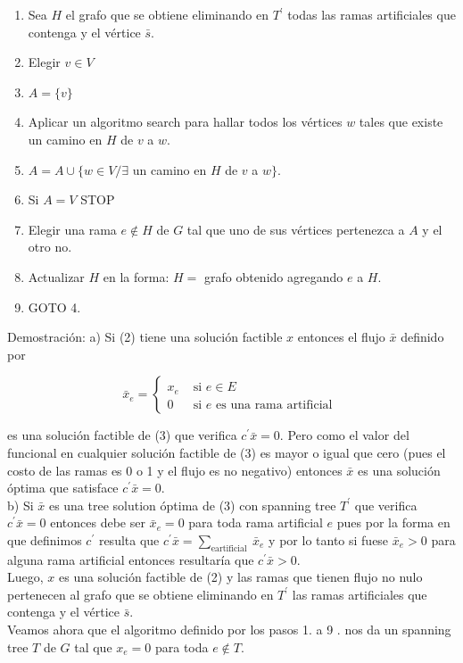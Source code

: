 \documentclass[10pt]{article}
\begin{document}
\begin{enumerate}
  \item Sea $H$ el grafo que se obtiene eliminando en $T^{\prime}$ todas las ramas artificiales que contenga y el vértice $\bar{s}$.
  \item Elegir $v \in V$
  \item $A=\{v\}$
  \item Aplicar un algoritmo search para hallar todos los vértices $w$ tales que existe un camino en $H$ de $v$ a $w$.
  \item $A=A \cup\{w \in V / \exists$ un camino en $H$ de $v$ a $w\}$.
  \item Si $A=V$ STOP
  \item Elegir una rama $e \notin H$ de $G$ tal que uno de sus vértices pertenezca a $A$ y el otro no.
  \item Actualizar $H$ en la forma: $H=$ grafo obtenido agregando $e$ a $H$.
  \item GOTO 4.
\end{enumerate}

Demostración: a) Si (2) tiene una solución factible $x$ entonces el flujo $\bar{x}$ definido por

$$
\bar{x}_{e}= \begin{cases}x_{e} & \text { si } e \in E \\ 0 & \text { si } e \text { es una rama artificial }\end{cases}
$$

es una solución factible de (3) que verifica $c^{\prime} \bar{x}=0$. Pero como el valor del funcional en cualquier solución factible de (3) es mayor o igual que cero (pues el costo de las ramas es 0 o 1 y el flujo es no negativo) entonces $\bar{x}$ es una solución óptima que satisface $c^{\prime} \bar{x}=0$.\\
b) Si $\bar{x}$ es una tree solution óptima de (3) con spanning tree $T^{\prime}$ que verifica $c^{\prime} \bar{x}=0$ entonces debe ser $\bar{x}_{e}=0$ para toda rama artificial $e$ pues por la forma en que definimos $c^{\prime}$ resulta que $c^{\prime} \bar{x}=\sum_{\text {eartificial }} \bar{x}_{e}$ y por lo tanto si fuese $\bar{x}_{e}>0$ para alguna rama artificial entonces resultaría que $c^{\prime} \bar{x}>0$.\\
Luego, $x$ es una solución factible de (2) y las ramas que tienen flujo no nulo pertenecen al grafo que se obtiene eliminando en $T^{\prime}$ las ramas artificiales que contenga y el vértice $\bar{s}$.\\
Veamos ahora que el algoritmo definido por los pasos 1. a 9 . nos da un spanning tree $T$ de $G$ tal que $x_{e}=0$ para toda $e \notin T$.
\end{document}
